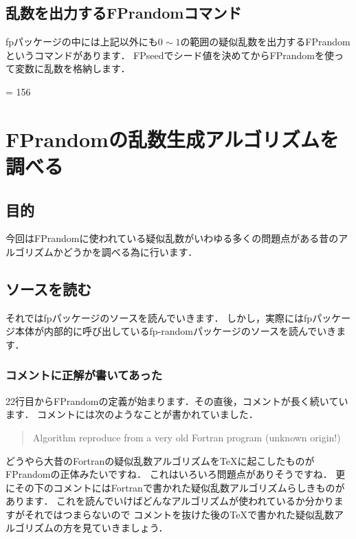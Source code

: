 \subsection{乱数を出力するFPrandomコマンド}
fpパッケージの中には上記以外にも$0\sim 1$の範囲の疑似乱数を出力するFPrandomというコマンドがあります．
FPseedでシード値を決めてからFPrandomを使って変数に乱数を格納します．
\begin{texcode}
\FPseed = 156
\FPrandom{\result}
\FPprint{\result}
\end{texcode}

\section{FPrandomの乱数生成アルゴリズムを調べる}
\subsection{目的}
今回はFPrandomに使われている疑似乱数がいわゆる多くの問題点がある昔のアルゴリズムかどうかを調べる為に行います．

\subsection{ソースを読む}
それではfpパッケージのソースを読んでいきます．
しかし，実際にはfpパッケージ本体が内部的に呼び出しているfp-randomパッケージのソースを読んでいきます．

\subsubsection{コメントに正解が書いてあった}
22行目からFPrandomの定義が始まります．その直後，コメントが長く続いています．
コメントには次のようなことが書かれていました．
\begin{quote}
Algorithm reproduce from a very old Fortran program (unknown origin!)
\end{quote}
どうやら大昔のFortranの疑似乱数アルゴリズムを\TeX に起こしたものがFPrandomの正体みたいですね．
これはいろいろ問題点がありそうですね．
更にその下のコメントにはFortranで書かれた疑似乱数アルゴリズムらしきものがあります．
これを読んでいけばどんなアルゴリズムが使われているか分かりますがそれではつまらないので
コメントを抜けた後の\TeX で書かれた疑似乱数アルゴリズムの方を見ていきましょう．

